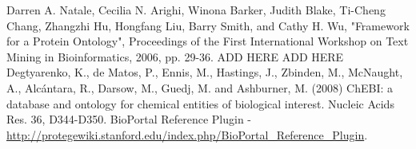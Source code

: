\documentclass{ao2e}%
\begin{document}
\begin{thebibliography}{}
 Darren A. Natale, Cecilia N. Arighi, Winona Barker, Judith Blake, Ti-Cheng Chang, Zhangzhi Hu, Hongfang Liu, Barry Smith, and Cathy H. Wu, "Framework for a Protein Ontology", Proceedings of the First International Workshop on Text Mining in Bioinformatics, 2006, pp. 29-36.
 ADD HERE
 ADD HERE
 Degtyarenko, K., de Matos, P., Ennis, M., Hastings, J., Zbinden, M., McNaught, A., Alcántara, R., Darsow, M., Guedj, M. and Ashburner, M. (2008) ChEBI: a database and ontology for chemical entities of biological interest. Nucleic Acids Res. 36, D344-D350.
 BioPortal Reference Plugin - \url{http://protegewiki.stanford.edu/index.php/BioPortal_Reference_Plugin}.

 
\end{thebibliography}





%


    
\begin{acronym}





\end{acronym}
\end{document}
